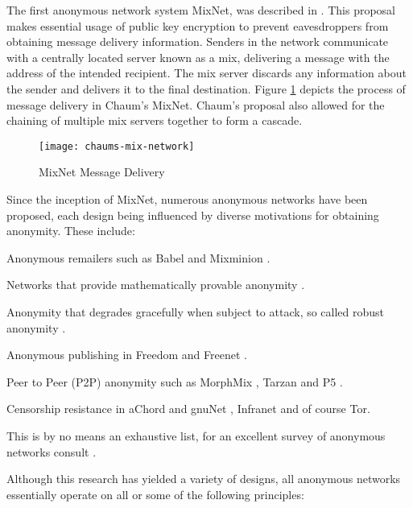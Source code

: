 \documentclass{ecuthesis}
\begin{document}
The first anonymous network system MixNet, was described in
\textcite{Chaum:1981p296}. This proposal makes essential usage of public key
encryption to prevent eavesdroppers from obtaining message delivery information.
Senders in the network communicate with a centrally located server known as a
mix, delivering a message with the address of the intended recipient. The mix
server discards any information about the sender and delivers it to the final
destination. Figure \ref{chaums-mix-network} depicts the process of message
delivery in Chaum's MixNet. Chaum's proposal also allowed for the chaining of
multiple mix servers together to form a cascade.

\begin{figure}[H]
  \centering\texttt{[image: chaums-mix-network]}
  \caption{MixNet Message Delivery}
  \label{chaums-mix-network}
\end{figure}

Since the inception of MixNet, numerous anonymous networks have been proposed,
each design being influenced by diverse motivations for obtaining anonymity.
These include:

\begin{itemize*}
  \item Anonymous remailers such as Babel \parencite{Gulcu:1996p1662} and
    Mixminion \parencite{Danezis:2003ys}.
  \item Networks that provide mathematically provable anonymity
    \parencite{Chaum:1988p5869,Waidner:1989p5870,Berman:2004p303}.
  \item Anonymity that degrades gracefully when subject to attack, so called
    robust anonymity \parencite{Waidner:1989p5870,Jakobsson:1998p5137}.
  \item Anonymous publishing in Freedom \parencite{Goldberg:1999p2231} and
    Freenet \parencite{Clarke:2001p2435}.
  \item Peer to Peer (P2P) anonymity such as MorphMix
    \parencite{Rennhard:2002p4559}, Tarzan \parencite{Freedman:2002kx} and P5
    \parencite{P5Sherwood:2005p5872}.
  \item Censorship resistance in aChord and gnuNet \parencite{Hazel:2002p6929},
    Infranet \parencite{Feamster:2002p307} and of course Tor.
\end{itemize*}

This is by no means an exhaustive list, for an excellent survey of anonymous
networks consult \textcite{Danezis:2008p346}.

Although this research has yielded a variety of designs, all anonymous
networks essentially operate on all or some of the following principles:
\end{document}
